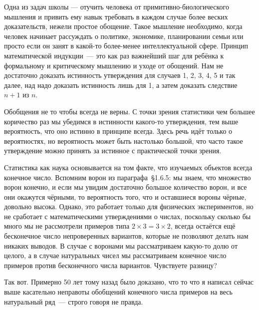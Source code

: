 Одна из задач школы --- отучить человека от примитивно-биологического мышления и привить ему навык требовать в каждом случае более веских доказательств, нежели простое обощение. Такое мышление необходимо, когда человек начинает рассуждать о политике, экономике, планировании семьи или просто если он занят в какой-то более-менее интеллектуальной сфере. Принцип математической индукции~--- это как раз важнейший шаг для ребёнка к формальному и критическому мышлению и уходе от обощений. Нам не достаточно доказать истинность утверждения для случаев 1, 2, 3, 4, 5 и так далее, над надо доказать истинность лишь для 1, а затем доказать следствие $n+1$ из $n$.

Обобщения не то чтобы всегда не верны. С точки зрения статистики чем большее коричество раз мы убедимся в истинности какого-то утверждения, тем выше вероятность, что оно истинно в принципе всегда. Здесь речь идёт только о вероятностях, но вероятность может быть настолько большой, что часто такое утверждение можно принять за истинное с практической точки зрения.

Статистика как наука основывается на том факте, что изучаемых объектов всегда конечное число. Вспомним ворон из параграфа~\S1.6.5: мы знаем, что множество ворон конечно, и если мы увидим достаточно большое количество ворон, и все они окажутся чёрными, то вероятность того, что и оставшиеся вороны чёрные, довольно высока. Однако, это работает только для физических экспериментов, но не сработает с математическими утверждениями о числах, поскольку сколько бы много мы не рассмотрели примеров типа $2\times 3=3\times 2$, всегда остаётся ещё бесконечное число непроверенных вариантов, которые не позволяют делать нам никаких выводов. В случае с воронами мы рассматриваем какую-то долю от целого, а в случае натуральных чисел мы рассматриваем конечное число примеров против бесконечного числа вариантов. Чувствуете разницу?

Так вот. Примерно 50 лет тому назад было доказано, что то что я написал сейчас выше касательно неправоты обобщений конечного числа примеров на весь натуральный ряд~--- строго говоря не правда.

